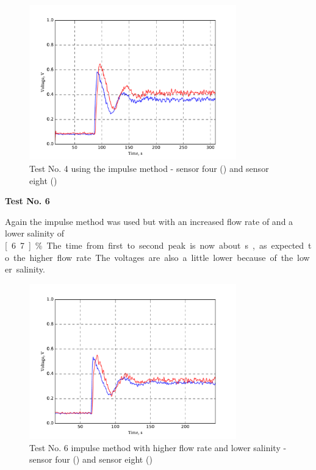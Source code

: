 \begin{figure}[H]
	\begin{center}
		\includegraphics[width=0.8\textwidth]{images/log080716_4.pdf} 
		\caption{Test No. 4 using the impulse method - sensor four (\drawline[blue]) and sensor eight (\drawline[red])}
		\label{fig:test4}
	\end{center}
\end{figure}

\textbf{Test No. 6}

Again the impulse method was used but with an increased flow rate of  and a lower salinity of \unit[6.7]{\%}. The time from first to second peak is now about \unit[40]{s}, as expected to the higher flow rate. The voltages are also a little lower because of the lower salinity.

\begin{figure}[H]
	\begin{center}
		\includegraphics[width=0.8\textwidth]{images/log080716_6.pdf} 
		\caption{Test No. 6 impulse method with higher flow rate and lower salinity - sensor four (\drawline[blue]) and sensor eight (\drawline[red])}
		\label{fig:test6}
	\end{center}
\end{figure}

